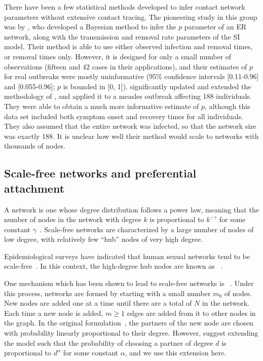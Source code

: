 There have been a few statistical methods developed to infer contact network
parameters without extensive contact tracing. The pioneering study in this
group was by \textcite{britton2002bayesian}, who developed a Bayesian method to
infer the $p$ parameter of an \gls{ER} network, along with the transmission and
removal rate parameters of the \gls{SI} model. Their method is able to use
either observed infection and removal times, or removal times only. However, it
is designed for only a small number of observations (fifteen and 42 cases in
their applications), and their estimates of $p$ for real outbreaks were mostly
uninformative (95\% confidence intervals [0.11-0.96] and [0.055-0.96]; $p$ is
bounded in [0, 1]). \textcite{groendyke2011bayesian} significantly updated and
extended the methodology of \citeauthor{britton2002bayesian}, and applied it to
a measles outbreak affecting 188 individuals. They were able to obtain a much
more informative estimate of $p$, although this data set included both symptom
onset and recovery times for all individuals. They also assumed that the entire
network was infected, so that the network size was exactly 188. It is unclear
how well their method would scale to networks with thousands of nodes.

\subsection{Scale-free networks and preferential attachment}
\label{subsec:pa}

A  network is one whose degree distribution follows a power
law, meaning that the number of nodes in the network with degree $k$ is
proportional to $k^{-\gamma}$ for some constant
$\gamma$~\autocite{barabasi1999emergence}. Scale-free networks are
characterized by a large number of nodes of low degree, with relatively few
``hub'' nodes of very high degree.

Epidemiological surveys have indicated that human sexual networks tend to be
scale-free~\autocite{liljeros2001web, schneeberger2004scale, colgate1989risk}.
In this context, the high-degree hub nodes are known as
~\autocite{kemper1980identification}.

One mechanism which has been shown to lead to scale-free networks is
~\autocite{simon1955class, barabasi1999emergence}.
Under this process, networks are formed by starting with a small number $m_0$
of nodes. New nodes are added one at a time until there are a total of $N$ in
the network. Each time a new node is added, $m \geq 1$ edges are added from it
to other nodes in the graph. In the original
formulation~\autocite{barabasi1999emergence}, the partners of the new node are
chosen with probability linearly proportional to their degree. However,
\citeauthor{barabasi1999emergence} suggest extending the model such that the
probability of choosing a partner of degree $d$ is proportional to $d^\alpha$
for some constant $\alpha$, and we use this extension here.

